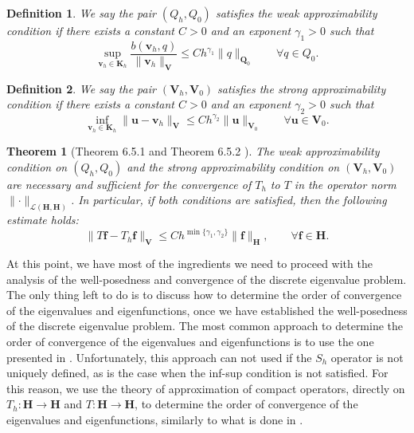 \documentclass[USenglish]{article}
\theoremstyle{dgthm}
\newtheorem{theorem}{Theorem}
\theoremstyle{dgdef}
\newtheorem{definition}{Definition}
\let\vec\bm
\newcommand\norm[1]{\lVert#1\rVert}
\begin{document}
\begin{definition}
  We say the pair $(Q_h,Q_0)$ satisfies the weak approximability condition if there exists a constant $C>0$ and an exponent $\gamma_1>0$ such that
  \begin{equation}
    \underset{\vec{v}_h\in \vec{K}_h}{\sup} \frac{b(\vec{v}_h,q)}{\norm{\vec{v}_h}_{\vec{V}}} \leq C h^{\gamma_1}\norm{q}_{\vec{Q}_0} \qquad \forall q\in Q_0.
  \end{equation}
\end{definition}
\begin{definition}
  We say the pair $(\vec{V}_h,\vec{V}_0)$ satisfies the strong approximability condition if there exists a constant $C>0$ and an exponent $\gamma_2>0$ such that
  \begin{equation}
    \label{eq:weakApprox}
    \underset{\vec{v}_h\in \vec{K}_h}{\inf} \norm{\vec{u}-\vec{v}_h}_{\vec{V}} \leq C h^{\gamma_2}\norm{\vec{u}}_{\vec{V}_0} \qquad \forall \vec{u}\in \vec{V}_0.
  \end{equation}
\end{definition}
\begin{theorem}[Theorem 6.5.1 and Theorem 6.5.2 \cite{BBF}]
  The weak approximability condition on $(Q_h,Q_0)$ and the strong approximability condition on $(\vec{V}_h,\vec{V}_0)$ are necessary and sufficient for the convergence of $T_h$ to $T$ in the operator norm $\norm{\cdot}_{\mathcal{L}(\vec{H},\vec{H})}$.
  In particular, if both conditions are satisfied, then the following estimate holds:
  \begin{equation}
    \norm{T\vec{f}-T_h\vec{f}}_{\vec{V}}\leq C h^{\min\{\gamma_1,\gamma_2\}}\norm{\vec{f}}_{\vec{H}}, \qquad \forall \vec{f}\in \vec{H}.
  \end{equation}
\end{theorem}
At this point, we have most of the ingredients we need to proceed with the analysis of the well-posedness and convergence of the discrete eigenvalue problem.
The only thing left to do is to discuss how to determine the order of convergence of the eigenvalues and eigenfunctions, once we have established the well-posedness of the discrete eigenvalue problem.
The most common approach to determine the order of convergence of the eigenvalues and eigenfunctions is to use the one presented in \cite{MercierOsbornRappazRaviart}.
Unfortunately, this approach can not used if the $S_h$ operator is not uniquely defined, as is the case when the inf-sup condition is not satisfied.
For this reason, we use the theory of approximation of compact operators, directly on $T_h:\vec{H}\to\vec{H}$ and $T:\vec{H}\to\vec{H}$, to determine the order of convergence of the eigenvalues and eigenfunctions, similarly to what is done in \cite{ErnGuermond, BrambleOsborn, Osborn, BabuskaOsborn}.
\end{document}
